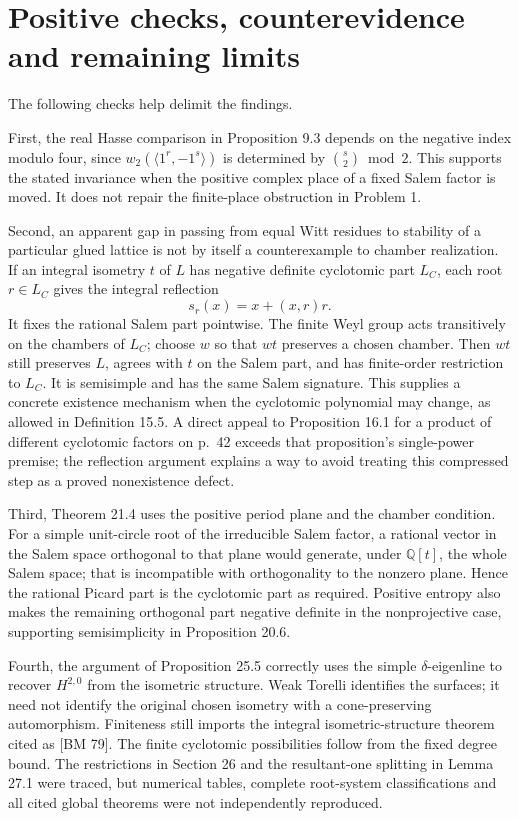 \documentclass[10pt]{article}
\begin{document}
\section*{Positive checks, counterevidence and remaining limits}
The following checks help delimit the findings.\par
First, the real Hasse comparison in Proposition 9.3 depends on the negative index modulo four, since \(w_2(\langle1^r,-1^s\rangle)\) is determined by \(\binom{s}{2}\bmod2\). This supports the stated invariance when the positive complex place of a fixed Salem factor is moved. It does not repair the finite-place obstruction in Problem 1.\par
Second, an apparent gap in passing from equal Witt residues to stability of a particular glued lattice is not by itself a counterexample to chamber realization. If an integral isometry \(t\) of \(L\) has negative definite cyclotomic part \(L_C\), each root \(r\in L_C\) gives the integral reflection \[s_r(x)=x+(x,r)r.\] It fixes the rational Salem part pointwise. The finite Weyl group acts transitively on the chambers of \(L_C\); choose \(w\) so that \(wt\) preserves a chosen chamber. Then \(wt\) still preserves \(L\), agrees with \(t\) on the Salem part, and has finite-order restriction to \(L_C\). It is semisimple and has the same Salem signature. This supplies a concrete existence mechanism when the cyclotomic polynomial may change, as allowed in Definition 15.5. A direct appeal to Proposition 16.1 for a product of different cyclotomic factors on p. 42 exceeds that proposition’s single-power premise; the reflection argument explains a way to avoid treating this compressed step as a proved nonexistence defect.\par
Third, Theorem 21.4 uses the positive period plane and the chamber condition. For a simple unit-circle root of the irreducible Salem factor, a rational vector in the Salem space orthogonal to that plane would generate, under \(\mathbb Q[t]\), the whole Salem space; that is incompatible with orthogonality to the nonzero plane. Hence the rational Picard part is the cyclotomic part as required. Positive entropy also makes the remaining orthogonal part negative definite in the nonprojective case, supporting semisimplicity in Proposition 20.6.\par
Fourth, the argument of Proposition 25.5 correctly uses the simple \(\delta\)-eigenline to recover \(H^{2,0}\) from the isometric structure. Weak Torelli identifies the surfaces; it need not identify the original chosen isometry with a cone-preserving automorphism. Finiteness still imports the integral isometric-structure theorem cited as [BM 79]. The finite cyclotomic possibilities follow from the fixed degree bound. The restrictions in Section 26 and the resultant-one splitting in Lemma 27.1 were traced, but numerical tables, complete root-system classifications and all cited global theorems were not independently reproduced.\par
\end{document}
